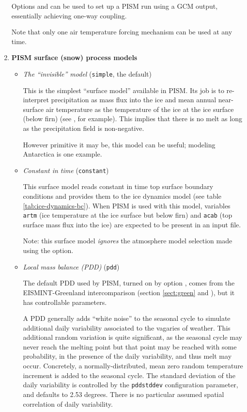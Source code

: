 \begin{enumerate}
  Options  and  can be used to set up a PISM run using a GCM output, essentially achieving one-way coupling.

  Note that only one air temperature forcing mechanism can be used at any time.

\item \textbf{PISM surface (snow) process models}
  \begin{itemize}
  \item \emph{The ``invisible'' model} (\verb|simple|, the default)

    This is the simplest ``surface model'' available in PISM. Its job is to re-interpret  precipitation as mass flux into the ice and mean annual near-surface air temperature as the temperature of the ice at the ice surface (below firn) (see \cite{Hock05}, for example). This implies that there is no melt as long as the precipitation field  is non-negative.

    However primitive it may be, this model can be useful; modeling Antarctica is one example.
  \item \emph{Constant in time} (\verb|constant|)

    This surface model reads constant in time top surface boundary conditions and provides them to the ice dynamics model (see table \ref{tab:ice-dynamics-bc}). When PISM is used with this model, variables \verb|artm| (ice temperature at the ice surface but below firn) and \verb|acab| (top surface mass flux into the ice) are expected to be present in an input file.

    Note: this surface model \emph{ignores}  the atmosphere model selection made using the  option.

  \item \emph{Local mass balance (PDD)} (\verb|pdd|)    

    The default PDD used by PISM, turned on by option , comes from the EISMINT-Greenland intercomparison (section \ref{sect:green} and \cite{RitzEISMINT}), but it has controllable parameters.

    A PDD generally adds ``white noise'' to the seasonal cycle to simulate additional daily variability associated to the vagaries of weather.  This additional random variation is quite significant, as the seasonal cycle may never reach the melting point but that point may be reached with some probability, in the presence of the daily variability, and thus melt may occur.  Concretely, a normally-distributed, mean zero random temperature increment is added to the seasonal cycle.  The standard deviation of the daily variability is controlled by the \texttt{pdd\und std\und dev} configuration parameter, and defaults to 2.53 degrees. There is no particular assumed spatial correlation of daily variability.


\end{itemize}
\end{enumerate}
